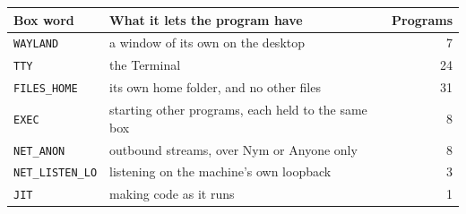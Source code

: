 \begin{tabular}{@{}llr@{}}
\toprule Box word & What it lets the program have & Programs\\ \midrule
\texttt{WAYLAND} & a window of its own on the desktop & 7\\
\texttt{TTY} & the Terminal & 24\\
\texttt{FILES\_HOME} & its own home folder, and no other files & 31\\
\texttt{EXEC} & starting other programs, each held to the same box & 8\\
\texttt{NET\_ANON} & outbound streams, over Nym or Anyone only & 8\\
\texttt{NET\_LISTEN\_LO} & listening on the machine's own loopback & 3\\
\texttt{JIT} & making code as it runs & 1\\
\bottomrule
\end{tabular}
